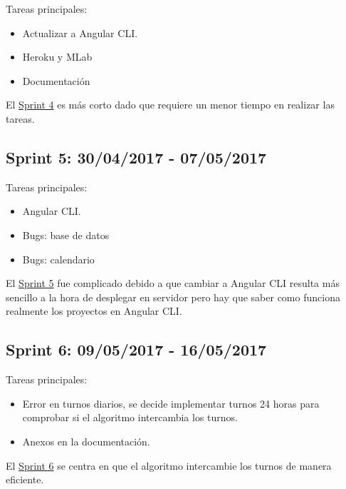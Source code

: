 Tareas principales:

\begin{itemize}
	\item Actualizar a Angular CLI.
	\item Heroku y MLab
	\item Documentación
\end{itemize}


El \underline{Sprint 4} es más corto dado que requiere un menor tiempo en realizar las tareas.

\subsection{Sprint 5: 30/04/2017 - 07/05/2017}\label{sprint5}

Tareas principales:

\begin{itemize}
	\item Angular CLI.
	\item Bugs: base de datos 
	\item Bugs: calendario
\end{itemize}


El \underline{Sprint 5} fue complicado debido a que cambiar a Angular CLI resulta más sencillo a la hora de desplegar en servidor pero hay que saber como funciona realmente los proyectos en Angular CLI.

\subsection{Sprint 6: 09/05/2017 - 16/05/2017}\label{sprint6}

Tareas principales:

\begin{itemize}
	
		\item Error en turnos diarios, se decide implementar turnos 24 horas para comprobar si el algoritmo intercambia los turnos.
	\item Anexos en la documentación.
\end{itemize}


El \underline{Sprint 6} se centra en que el algoritmo intercambie los turnos de manera eficiente. 

